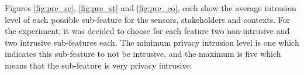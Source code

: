 \begin{figure}[htp]
  \hspace{1em}
   \newline
  \centering
  \caption{}
  \label{fig:pre11}
\end{figure}

Figures \ref{fig:pre_se}, \ref{fig:pre_st} and \ref{fig:pre_co}, each show the average intrusion level of each possible sub-feature for
the sensors, stakeholders and contexts. For the experiment, it was decided to choose for each feature two non-intrusive and two intrusive sub-features
each. The minimum privacy intrusion level is one which indicates this sub-feature to not be intrusive, and the maximum is five which means that the sub-feature is very privacy intrusive.

